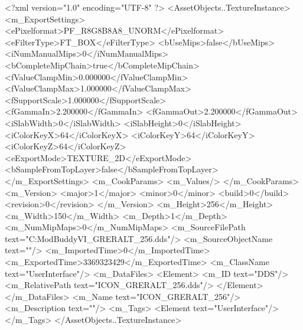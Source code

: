 <?xml version="1.0" encoding="UTF-8" ?>
<AssetObjects..TextureInstance>
	<m_ExportSettings>
		<ePixelformat>PF_R8G8B8A8_UNORM</ePixelformat>
		<eFilterType>FT_BOX</eFilterType>
		<bUseMips>false</bUseMips>
		<iNumManualMips>0</iNumManualMips>
		<bCompleteMipChain>true</bCompleteMipChain>
		<fValueClampMin>0.000000</fValueClampMin>
		<fValueClampMax>1.000000</fValueClampMax>
		<fSupportScale>1.000000</fSupportScale>
		<fGammaIn>2.200000</fGammaIn>
		<fGammaOut>2.200000</fGammaOut>
		<iSlabWidth>0</iSlabWidth>
		<iSlabHeight>0</iSlabHeight>
		<iColorKeyX>64</iColorKeyX>
		<iColorKeyY>64</iColorKeyY>
		<iColorKeyZ>64</iColorKeyZ>
		<eExportMode>TEXTURE_2D</eExportMode>
		<bSampleFromTopLayer>false</bSampleFromTopLayer>
	</m_ExportSettings>
	<m_CookParams>
		<m_Values/>
	</m_CookParams>
	<m_Version>
		<major>1</major>
		<minor>0</minor>
		<build>0</build>
		<revision>0</revision>
	</m_Version>
	<m_Height>256</m_Height>
	<m_Width>150</m_Width>
	<m_Depth>1</m_Depth>
	<m_NumMipMaps>0</m_NumMipMaps>
	<m_SourceFilePath text="C:\Users\asus\Documents\Firaxis ModBuddy\Civilization VI\temppic\ICON_GRERALT_256.dds"/>
	<m_SourceObjectName text=""/>
	<m_ImportedTime>0</m_ImportedTime>
	<m_ExportedTime>3369323429</m_ExportedTime>
	<m_ClassName text="UserInterface"/>
	<m_DataFiles>
		<Element>
			<m_ID text="DDS"/>
			<m_RelativePath text="ICON_GRERALT_256.dds"/>
		</Element>
	</m_DataFiles>
	<m_Name text="ICON_GRERALT_256"/>
	<m_Description text=""/>
	<m_Tags>
		<Element text="UserInterface"/>
	</m_Tags>
</AssetObjects..TextureInstance>

